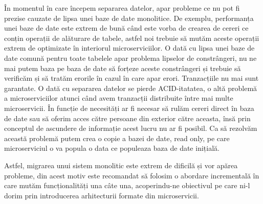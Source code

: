 În momentul în care începem separarea datelor, apar probleme ce nu pot fi prezise cauzate de lipsa
unei baze de date monolitice. De exemplu, performanța unei baze de date este extrem de bună când este vorba
de crearea de cereri ce conțin operații de alăturare de tabele, astfel noi trebuie să mutăm aceste operații
extrem de optimizate în interiorul microserviciilor. O dată cu lipsa unei baze de date comună pentru toate
tabelele apar problema lipselor de constrângeri, nu ne mai putem baza pe baza de date să 
forțeze aceste constrângeri și trebuie să verificăm și să tratăm erorile în cazul în care apar erori.
Tranzacțiile nu mai sunt garantate. O dată cu separarea datelor se pierde ACID-itatatea, o altă problemă 
a microserviciilor atunci când avem tranzacții distribuite între mai multe microservicii. 
În funcție de necesități ar fi necesar să rulăm cereri direct în baza de date sau să oferim acces
către persoane din exterior către aceasta, însă prin conceptul
de ascundere de informație acest lucru nu ar fi posibil. Ca să rezolvăm această problemă putem crea o copie
a bazei de date, read only, pe care microserviciul o va popula o data ce populeaza baza de date inițială.

Astfel, migrarea unui sistem monolitic este extrem de dificilă și vor apărea probleme, din acest
motiv este recomandat să folosim o abordare incrementală în care mutăm funcționalități una câte una,
acoperindu-ne obiectivul pe care ni-l dorim prin introducerea arhitecturii formate din microservicii.
